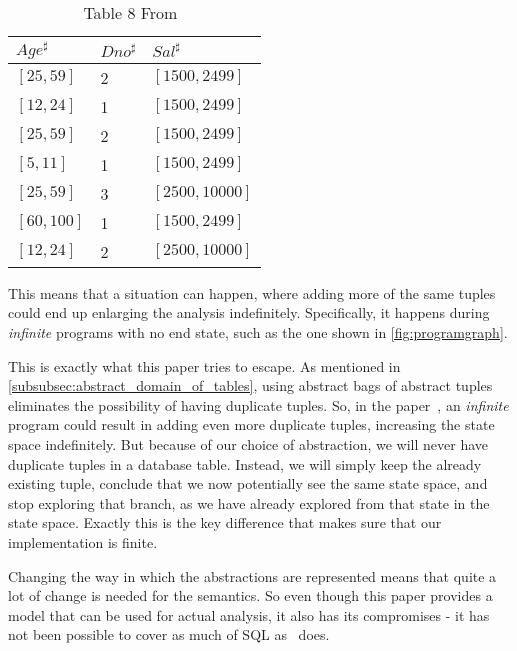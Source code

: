 \begin{table}
    \renewcommand{\arraystretch}{1.3}
    \centering
    \caption{Table 8 From~\cite{halder_abstract_2012}}
    \begin{tabular}{lll}
        \toprule
        $Age^\sharp$ & $Dno^\sharp$ & $Sal^\sharp$   \\ \midrule
        $[25,59]$    & 2            & $[1500,2499]$  \\
        $[12,24]$    & 1            & $[1500,2499]$  \\
        $[25,59]$    & 2            & $[1500,2499]$  \\
        $[5,11]$     & 1            & $[1500,2499]$  \\
        $[25,59]$    & 3            & $[2500,10000]$ \\
        $[60,100]$   & 1            & $[1500,2499]$  \\
        $[12,24]$    & 2            & $[2500,10000]$ \\ \bottomrule
    \end{tabular}\label{tab:table-halder}
\end{table}


This means that a situation can happen, where adding more of the same tuples could end up enlarging the analysis indefinitely.
Specifically, it happens during \textit{infinite} programs with no end state, such as the one shown in \autoref{fig:programgraph}.

This is exactly what this paper tries to escape.
As mentioned in \autoref{subsubsec:abstract_domain_of_tables}, using abstract bags of abstract tuples eliminates the possibility of having duplicate tuples.
So, in the paper~\cite{halder_abstract_2012}, an \textit{infinite} program could result in adding even more duplicate tuples, increasing the state space indefinitely.
But because of our choice of abstraction, we will never have duplicate tuples in a database table.
Instead, we will simply keep the already existing tuple, conclude that we now potentially see the same state space, and stop exploring that branch, as we have already explored from that state in the state space.
Exactly this is the key difference that makes sure that our implementation is finite.

Changing the way in which the abstractions are represented means that quite a lot of change is needed for the semantics.
So even though this paper provides a model that can be used for actual analysis, it also has its compromises - it has not been possible to cover as much of SQL as~\cite{halder_abstract_2012} does.

